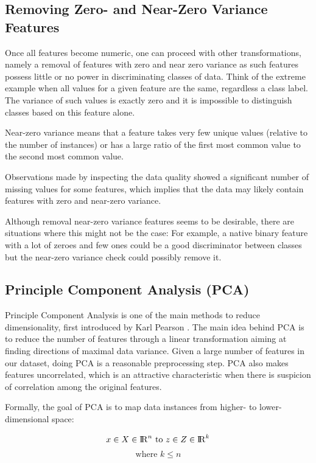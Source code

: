 \subsection{Removing Zero- and Near-Zero Variance Features}\label{Ch:2:RNZVF}
Once all features become numeric, one can proceed with other transformations, namely a removal of features with zero and near zero variance as such features possess little or no power in discriminating classes of data. Think of the extreme example when all values for a given feature are the same, regardless a class label. The variance of such values is exactly zero and it is impossible to distinguish classes based on this feature alone.

Near-zero variance means that a feature takes very few unique values (relative to the number of instances) or has a large ratio of the first most common value to the second most common value.

Observations made by inspecting the data quality showed a significant number of missing values for some features, which implies that the data may likely contain features with zero and near-zero variance.

Although removal near-zero variance features seems to be desirable, there are situations where this might not be the case: For example, a native binary feature with a lot of zeroes and few ones could be a good discriminator between classes but the near-zero variance check could possibly remove it.

\subsection{Principle Component Analysis (PCA)}\label{Ch:2:PCA} 
Principle Component Analysis is one of the main methods to reduce dimensionality, first introduced by Karl Pearson \cite{Pearson:1901}. The main idea behind PCA is to reduce the number of features through a linear transformation aiming at finding directions of maximal data variance. Given a large number of features in our dataset, doing PCA is a reasonable preprocessing step. PCA also makes features uncorrelated, which is an attractive characteristic when there is suspicion of correlation among the original features.

Formally, the goal of PCA is to map data instances from higher- to lower-dimensional space:

\[ x \in X \in {\rm I\!R}^n \textrm{ to } z \in Z \in {\rm I\!R}^k \]
\[ \textrm{where } k \leq n \]

